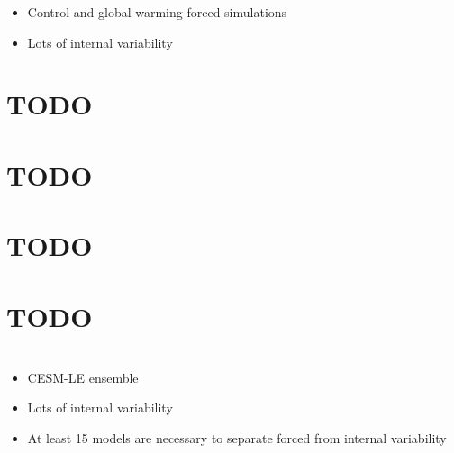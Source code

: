\documentclass[11pt]{article}
\begin{document}
\begin{itemize}
\item Control and global warming forced simulations
\item Lots of internal variability
\end{itemize}

\section{{\bfseries\sffamily TODO} \cite{wang2016nino}}
\label{sec:org937c167}
\section{{\bfseries\sffamily TODO} \cite{yeo2016role}}
\label{sec:orgf9d0601}
\section{{\bfseries\sffamily TODO} \cite{zhang2019review}}
\label{sec:orgfbc580a}
\section{{\bfseries\sffamily TODO} \cite{zheng2016intermodel}}
\label{sec:orgbd6185d}

\section{\cite{zheng2017response}}
\label{sec:orgcd8dd72}

\begin{itemize}
\item CESM-LE ensemble
\item Lots of internal variability
\item At least 15 models are necessary to separate forced from internal variability
\end{itemize}




\end{document}
